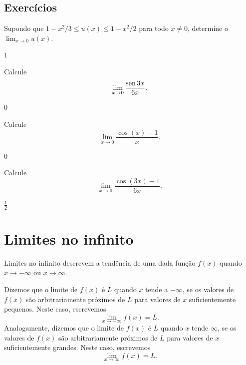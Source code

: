 \subsection*{Exercícios}

\begin{exer}
  Supondo que $1-x^2/3 \leq u(x) \leq 1-x^2/2$ para todo $x\neq 0$, determine o $\lim_{x\to 0} u(x)$.
\end{exer}
\begin{resp}
  $1$
\end{resp}

\begin{exer}
  Calcule
  \begin{equation}
    \lim_{x\to 0} \frac{\operatorname{sen} 3x}{6x}.
  \end{equation}
\end{exer}
\begin{resp}
  $0$
\end{resp}

\begin{exer}\label{exer:lim_cosx_1}
  Calcule
  \begin{equation}
    \lim_{x\to 0} \frac{\cos(x)-1}{x}.
  \end{equation}
\end{exer}
\begin{resp}
  $0$
\end{resp}

\begin{exer}
  Calcule
  \begin{equation}
    \lim_{x\to 0} \frac{\cos(3x)-1}{6x}.
  \end{equation}
\end{exer}
\begin{resp}
  $\frac{1}{2}$
\end{resp}

\emconstrucao

\section{Limites no infinito}\label{cap_lim_sec_liminf}

Limites no infinito descrevem a tendência de uma dada função $f(x)$ quando $x\to -\infty$ ou $x\to\infty$.

Dizemos que o limite de $f(x)$ é $L$ quando $x$ tende a $-\infty$, se os valores de $f(x)$ são arbitrariamente próximos de $L$ para valores de $x$ suficientemente pequenos. Neste caso, escrevemos
\begin{equation}
  \lim_{x\to -\infty} f(x) = L.
\end{equation}
Analogamente, dizemos que o limite de $f(x)$ é $L$ quando $x$ tende $\infty$, se os valores de $f(x)$ são arbitrariamente próximos de $L$ para valores de $x$ suficientemente grandes. Neste caso, escrevemos
\begin{equation}
  \lim_{x\to \infty} f(x) = L.
\end{equation}


